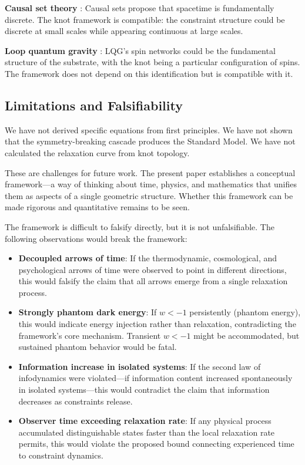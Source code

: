 \documentclass[11pt,a4paper]{article}
\begin{document}
\textbf{Causal set theory} \cite{sorkin2003}: Causal sets propose that spacetime is fundamentally discrete. The knot framework is compatible: the constraint structure could be discrete at small scales while appearing continuous at large scales.

\textbf{Loop quantum gravity} \cite{rovelli2004}: LQG's spin networks could be the fundamental structure of the substrate, with the knot being a particular configuration of spins. The framework does not depend on this identification but is compatible with it.

\subsection{Limitations and Falsifiability}

We have not derived specific equations from first principles. We have not shown that the symmetry-breaking cascade produces the Standard Model. We have not calculated the relaxation curve from knot topology.

These are challenges for future work. The present paper establishes a conceptual framework---a way of thinking about time, physics, and mathematics that unifies them as aspects of a single geometric structure. Whether this framework can be made rigorous and quantitative remains to be seen.

The framework is difficult to falsify directly, but it is not unfalsifiable. The following observations would break the framework:

\begin{itemize}
    \item \textbf{Decoupled arrows of time}: If the thermodynamic, cosmological, and psychological arrows of time were observed to point in different directions, this would falsify the claim that all arrows emerge from a single relaxation process.

    \item \textbf{Strongly phantom dark energy}: If $w < -1$ persistently (phantom energy), this would indicate energy injection rather than relaxation, contradicting the framework's core mechanism. Transient $w < -1$ might be accommodated, but sustained phantom behavior would be fatal.

    \item \textbf{Information increase in isolated systems}: If the second law of infodynamics were violated---if information content increased spontaneously in isolated systems---this would contradict the claim that information decreases as constraints release.

    \item \textbf{Observer time exceeding relaxation rate}: If any physical process accumulated distinguishable states faster than the local relaxation rate permits, this would violate the proposed bound connecting experienced time to constraint dynamics.
\end{itemize}
\end{document}
